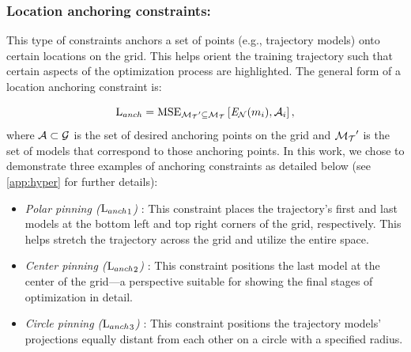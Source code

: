 \documentclass[letterpaper]{article} %
\begin{document}
            
            \subsubsection{Location anchoring constraints:} \label{p:anchoring}
            This type of constraints anchors a set of points (e.g., trajectory models) onto certain locations on the grid. This helps orient the training trajectory such that certain aspects of the optimization process are highlighted. The general form of a location anchoring constraint is:


            \begin{equation}
                \text{L}_{anch} = \text{MSE}_{\mathcal{M_T}^\prime \subseteq \mathcal{M_T}} \left[ \mathit{E}_{\mathcal{N}}(m_{i}) , \mathcal{A}_i \right],
            \end{equation}
            where $\mathcal{A} \subset \mathcal{G}$ is the set of desired anchoring points on the grid and $\mathcal{M_T}^\prime$ is the set of models that correspond to those anchoring points.
            In this work, we chose to demonstrate three  examples of anchoring constraints as detailed below (see \cref{app:hyper} for further details): 

            \begin{itemize}[itemsep=0em]
            \item \textit{Polar pinning (${\text{L}_{anch}}_1$) }: This constraint places the trajectory's first and last models at the bottom left and top right corners of the grid, respectively. This helps stretch the trajectory across the grid and utilize the entire space.
            \item \textit{Center pinning (${\text{L}_{anch}}_2$) }: This constraint positions the last model at the center of the grid---a perspective suitable for showing the final stages of optimization in  detail.
            \item \textit{Circle pinning (${\text{L}_{anch}}_3$) }: This constraint positions the trajectory models' projections equally distant from each other on a circle with a specified radius.
            \end{itemize}
\end{document}
